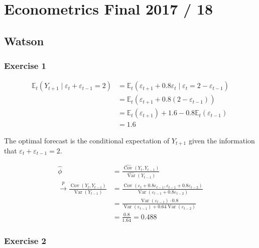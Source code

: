 \section{Econometrics Final 2017 / 18}

{
\subsection*{Watson}

{
\subsubsection*{Exercise 1}

\begin{enumerate}[label=(\alph*)]
{\item 
$$
\begin{aligned}
\mathbb{E}_{t}\left(Y_{t+1} \mid \varepsilon_{t}+\varepsilon_{t-1}=2\right) & =\mathbb{E}_{t}\left(\varepsilon_{t+1}+0.8 \varepsilon_{t} \mid \varepsilon_{t}=2-\varepsilon_{t-1}\right) \\
& =\mathbb{E}_{t}\left(\varepsilon_{t+1}+0.8\left(2-\varepsilon_{t-1}\right)\right) \\
& =\mathbb{E}_{t}\left(\varepsilon_{t+1}\right)+1.6-0.8 \mathbb{E}_{t}\left(\varepsilon_{t-1}\right) \\
& =1.6
\end{aligned}
$$

The optimal forecast is the conditional expectation of $Y_{t+1}$ given the information that $\varepsilon_{t}+\varepsilon_{t-1}=2$.
}
{\item 
$$
\begin{aligned}
\hat{\phi} &= \frac{\widehat{\operatorname{Cov}}\left(Y_{t}, Y_{t-1}\right)}{\widehat{\operatorname{Var}}\left(Y_{t-1}\right)} \\
\xrightarrow{p} \frac{\operatorname{Cov}\left(Y_{t}, Y_{t-1}\right)}{\operatorname{Var}\left(Y_{t-1}\right)} & =\frac{\operatorname{Cov}\left(\varepsilon_{t}+0.8 \varepsilon_{t-1}, \varepsilon_{t-1}+0.8 \varepsilon_{t-2}\right)}{\operatorname{Var}\left(\varepsilon_{t-1}+0.8 \varepsilon_{t-2}\right)} \\
& =\frac{\operatorname{Var}\left(\varepsilon_{t-1}\right) \cdot 0.8}{\operatorname{Var}\left(\varepsilon_{t-1}\right)+0.64 \operatorname{Var}\left(\varepsilon_{t-2}\right)} \\
& =\frac{0.8}{1.64}=0.488
\end{aligned}
$$
}
\end{enumerate}
}
{
\subsubsection*{Exercise 2}

}}
